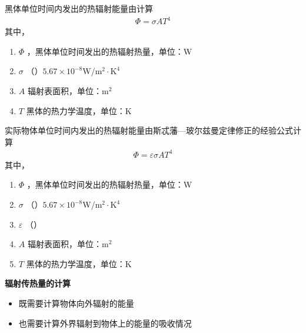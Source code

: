 黑体单位时间内发出的热辐射能量由计算
\begin{align}
	\varPhi = \sigma A T^4
\end{align}
其中，
\begin{enumerate}[\hspace*{1.5em}]
	\item $\varPhi$ \quad {}，黑体单位时间发出的热辐射热量，单位：W\vspace*{-0.5em}
	\item $\sigma$ \quad {}（）$5.67 \times 10^{-8}$W/$\text{m}^2\cdot \text{K}^4$\vspace*{-0.5em}
	\item $A$ \quad 辐射表面积，单位：$\text{m}^2$\vspace*{-0.5em}
	\item $T$ \quad 黑体的热力学温度，单位：K
\end{enumerate}
\vspace*{1em}

实际物体单位时间内发出的热辐射能量由斯忒藩—玻尔兹曼定律修正的经验公式计算
\begin{align}
	\varPhi = \varepsilon \sigma A T^4
\end{align}
其中，
\begin{enumerate}[\hspace*{1.5em}]
	\item $\varPhi$ \quad {}，黑体单位时间发出的热辐射热量，单位：W\vspace*{-0.5em}
	\item $\sigma$ \quad {}（）$5.67 \times 10^{-8}$W/$\text{m}^2\cdot \text{K}^4$\vspace*{-0.5em}
	\item $\varepsilon$ \quad {}（）\vspace*{-0.5em}
	\item $A$ \quad 辐射表面积，单位：$\text{m}^2$\vspace*{-0.5em}
	\item $T$ \quad 黑体的热力学温度，单位：K\vspace*{-0.5em}
\end{enumerate}
\vspace*{1em}

\noindent \textbf{辐射传热量的计算}\vspace*{-0.5em}
\begin{itemize}
	\item 既需要计算物体向外辐射的能量\vspace*{-0.5em}
	\item 也需要计算外界辐射到物体上的能量的吸收情况
\end{itemize}

